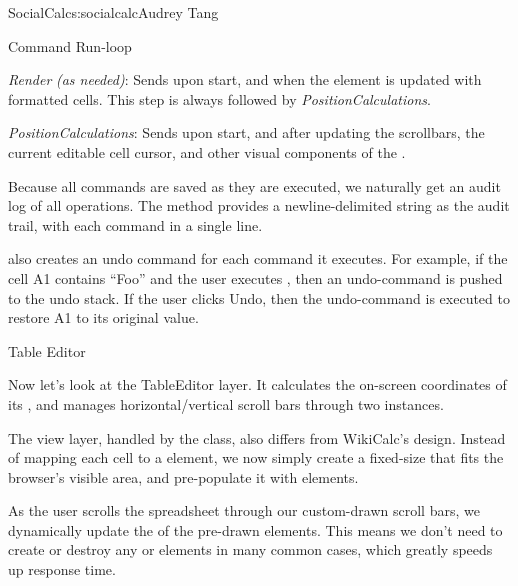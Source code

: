 \begin{aosachapter}{SocialCalc}{s:socialcalc}{Audrey Tang}
\begin{aosasect1}{Command Run-loop}
\begin{aosadescription}
  \item{\emph{Render}} \emph{(as{ }needed)}: Sends  upon
  start, and  when the
   element is updated with
  formatted cells. This step is always followed by \emph{PositionCalculations}.

  \item{\emph{PositionCalculations}}: Sends  upon
  start, and  after updating the scrollbars, the
  current editable cell cursor, and other visual components of the
  .

\end{aosadescription}

Because all commands are saved as they are executed, we naturally get
an audit log of all operations.  The 
method provides a newline-delimited string as the audit trail, with
each command in a single line.

 also creates an undo command for each
command it executes.  For example, if the cell A1 contains ``Foo''
and the user executes , then an undo-command
 is pushed to the undo stack.  If the user
clicks Undo, then the undo-command is executed to restore A1 to its
original value.

\end{aosasect1}

\begin{aosasect1}{Table Editor}

Now let's look at the TableEditor layer.  It calculates the on-screen
coordinates of its , and manages
horizontal/vertical scroll bars through two 
instances.


The view layer, handled by the  class, also
differs from WikiCalc's design.  Instead of mapping each cell to a
 element, we now simply create a
fixed-size  that fits the
browser's visible area, and pre-populate it with
 elements.

As the user scrolls the spreadsheet through our custom-drawn scroll
bars, we dynamically update the  of the pre-drawn
 elements.  This means we don't need to
create or destroy any  or
 elements in many common cases,
which greatly speeds up response time.


\end{aosasect1}
\end{aosachapter}

